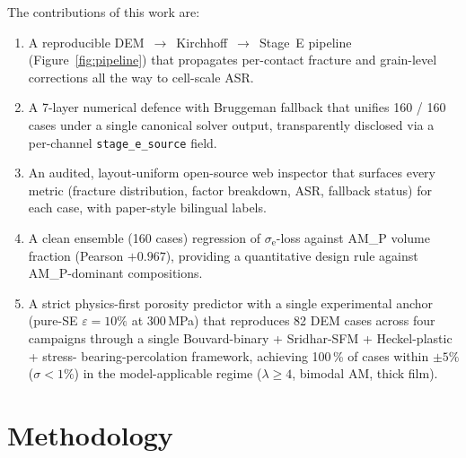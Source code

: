 \documentclass[11pt, a4paper]{article}
\newcommand{\sigmae}{\ensuremath{\sigma_{\mathrm{e}}}}
\begin{document}
The contributions of this work are:
\begin{enumerate}
\item A reproducible DEM~$\to$~Kirchhoff~$\to$~Stage~E pipeline
      (Figure~\ref{fig:pipeline}) that propagates per-contact
      fracture and grain-level corrections all the way to
      cell-scale ASR.
\item A 7-layer numerical defence with Bruggeman fallback that
      unifies 160 / 160 cases under a single canonical solver
      output, transparently disclosed via a per-channel
      \texttt{stage\_e\_source} field.
\item An audited, layout-uniform open-source web inspector that
      surfaces every metric (fracture distribution, factor
      breakdown, ASR, fallback status) for each case, with
      paper-style bilingual labels.
\item A clean ensemble (160 cases) regression of $\sigmae$-loss
      against AM\_P volume fraction (Pearson $+0.967$),
      providing a quantitative design rule against AM\_P-dominant
      compositions.
\item A strict physics-first porosity predictor with a single
      experimental anchor (pure-SE $\varepsilon = 10\%$ at 300\,MPa)
      that reproduces 82 DEM cases across four campaigns through a
      single Bouvard-binary + Sridhar-SFM + Heckel-plastic + stress-
      bearing-percolation framework, achieving 100\,\% of cases within
      $\pm 5\%$ ($\sigma < 1\%$) in the model-applicable regime
      ($\lambda \ge 4$, bimodal AM, thick film).
\end{enumerate}

\section{Methodology}
\label{sec:methods}
\end{document}
